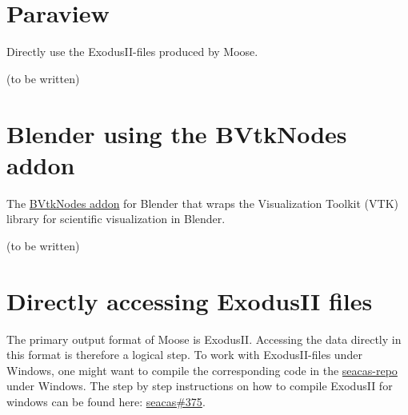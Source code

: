 \section{\todomarker Paraview}
\label{chap:postprocessing-paraview}

Directly use the ExodusII-files produced by Moose.

(to be written)

\section{\todomarker Blender using the BVtkNodes addon}
\label{chap:postprocessing-blender}

The \href{https://github.com/tkeskita/BVtkNodes}{BVtkNodes addon} for Blender
that wraps the Visualization Toolkit (VTK) library for scientific visualization
in Blender.

(to be written)

\section{Directly accessing ExodusII files}
\label{chap:postprocessing-ExodusII}

The primary output format of Moose is ExodusII. Accessing the data directly in
this format is therefore a logical step. To work with ExodusII-files under
Windows, one might want to compile the corresponding code in the
\href{https://github.com/sandialabs/seacas}{seacas-repo} under Windows. The
step by step instructions on how to compile ExodusII for windows can be found
here: \href{https://github.com/sandialabs/seacas/discussions/375}{seacas\#375}.
